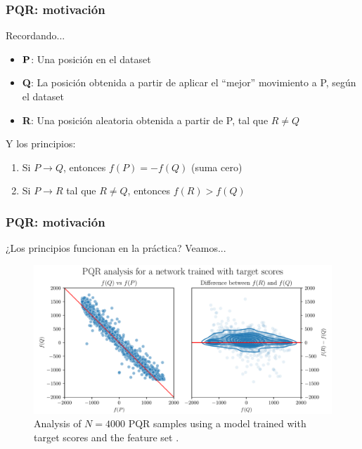 
\begin{frame}
\frametitle{PQR: motivación}
Recordando...
\begin{itemize}
\item $\bf P$: Una posición en el dataset
\item \textbf{Q}: La posición obtenida a partir de aplicar el \enquote{mejor} movimiento a P, según el dataset
\item \textbf{R}: Una posición aleatoria obtenida a partir de P, tal que $R \neq Q$
\end{itemize}
\pause
Y los principios:
\begin{enumerate}
\item Si $P \rightarrow Q$, entonces $f(P)=-f(Q)$ (suma cero)
\item Si $P \rightarrow R$ tal que $R \neq Q$, entonces $f(R) > f(Q)$
\end{enumerate}
\end{frame}


\begin{frame}
\frametitle{PQR: motivación}
¿Los principios funcionan en la práctica? Veamos...
\begin{figure}
\centering
\includegraphics[width=\textwidth]{../thesis/dynamic/output/pqr_eval.pdf}
\caption{Analysis of $N=4000$ PQR samples using a model trained with target scores and the feature set .}
\end{figure}
\end{frame}

